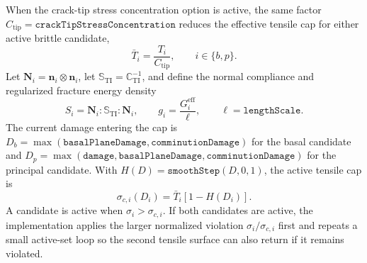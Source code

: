 When the crack-tip stress concentration option is active, the same factor \(C_{\mathrm{tip}}=\texttt{crackTipStressConcentration}\) reduces the effective tensile cap for either active brittle candidate,
\begin{equation}
  \bar T_i = \frac{T_i}{C_{\mathrm{tip}}},
  \qquad i\in\{b,p\}.
  \label{eq:graphite-brittle-effective-strength}
\end{equation}
Let \(\mathbf N_i=\mathbf n_i\otimes\mathbf n_i\), let \(\mathbb S_{\mathrm{TI}}=\mathbb C_{\mathrm{TI}}^{-1}\), and define the normal compliance and regularized fracture energy density
\begin{equation}
  S_i = \mathbf N_i:\mathbb S_{\mathrm{TI}}:\mathbf N_i,
  \qquad
  g_i=\frac{G_i^{\mathrm{eff}}}{\ell},
  \qquad
  \ell=\texttt{lengthScale}.
  \label{eq:graphite-brittle-compliance}
\end{equation}
The current damage entering the cap is \(D_b=\max(\texttt{basalPlaneDamage},\texttt{comminutionDamage})\) for the basal candidate and \(D_p=\max(\texttt{damage},\texttt{basalPlaneDamage},\texttt{comminutionDamage})\) for the principal candidate.  With \(H(D)=\texttt{smoothStep}(D,0,1)\), the active tensile cap is
\begin{equation}
  \sigma_{c,i}(D_i)=\bar T_i\left[1-H(D_i)\right].
  \label{eq:graphite-brittle-cap}
\end{equation}
A candidate is active when \(\sigma_i>\sigma_{c,i}\).  If both candidates are active, the implementation applies the larger normalized violation \(\sigma_i/\sigma_{c,i}\) first and repeats a small active-set loop so the second tensile surface can also return if it remains violated.

